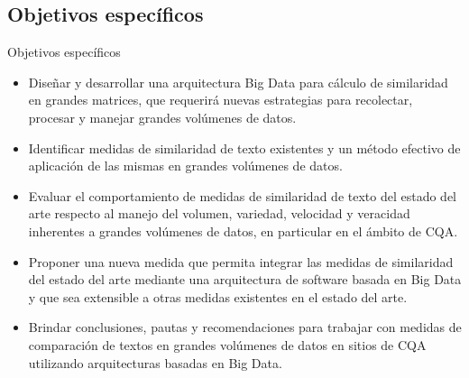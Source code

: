 \subsection{Objetivos específicos}
\begin{frame}{Objetivos específicos}
	\scriptsize
	\begin{itemize} [<+>]
		\item Diseñar y desarrollar una arquitectura Big Data para cálculo de similaridad en grandes matrices, que requerirá nuevas estrategias para recolectar, procesar y manejar grandes volúmenes de datos.
		\item Identificar medidas de similaridad de texto existentes y un método efectivo de aplicación de las mismas en grandes volúmenes de datos.
		\item Evaluar el comportamiento de medidas de similaridad de texto del estado del arte respecto al manejo del volumen, variedad, velocidad y veracidad inherentes a grandes volúmenes de datos, en particular en el ámbito de CQA.
		\item Proponer una nueva medida que permita integrar las medidas de similaridad del estado del arte mediante una arquitectura de software basada en Big Data y que sea extensible a otras medidas existentes en el estado del arte.
		\item Brindar conclusiones, pautas y recomendaciones para trabajar con medidas de comparación de textos en grandes volúmenes de datos en sitios de CQA utilizando arquitecturas basadas en Big Data.
	\end{itemize}
\end{frame}